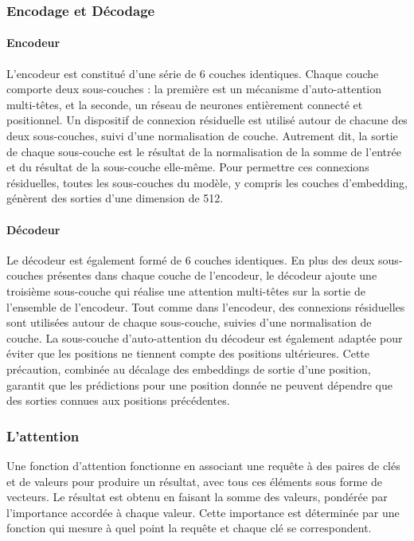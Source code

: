 \subsubsection{Encodage et Décodage}

\paragraph{Encodeur} \hspace{0pt}

L'encodeur est constitué d'une série de 6 couches identiques. Chaque couche comporte deux sous-couches : la première est un mécanisme d'auto-attention multi-têtes, et la seconde, un réseau de neurones entièrement connecté et positionnel. Un dispositif de connexion résiduelle est utilisé autour de chacune des deux sous-couches, suivi d'une normalisation de couche. Autrement dit, la sortie de chaque sous-couche est le résultat de la normalisation de la somme de l'entrée et du résultat de la sous-couche elle-même. Pour permettre ces connexions résiduelles, toutes les sous-couches du modèle, y compris les couches d'embedding, génèrent des sorties d'une dimension de 512.

\paragraph{Décodeur} \hspace{0pt}

Le décodeur est également formé de 6 couches identiques. En plus des deux sous-couches présentes dans chaque couche de l'encodeur, le décodeur ajoute une troisième sous-couche qui réalise une attention multi-têtes sur la sortie de l'ensemble de l'encodeur. Tout comme dans l'encodeur, des connexions résiduelles sont utilisées autour de chaque sous-couche, suivies d'une normalisation de couche. La sous-couche d'auto-attention du décodeur est également adaptée pour éviter que les positions ne tiennent compte des positions ultérieures. Cette précaution, combinée au décalage des embeddings de sortie d'une position, garantit que les prédictions pour une position donnée ne peuvent dépendre que des sorties connues aux positions précédentes.

\subsubsection{L'attention}
Une fonction d'attention fonctionne en associant une requête à des paires de clés et de valeurs pour produire un résultat, avec tous ces éléments sous forme de vecteurs. Le résultat est obtenu en faisant la somme des valeurs, pondérée par l'importance accordée à chaque valeur. Cette importance est déterminée par une fonction qui mesure à quel point la requête et chaque clé se correspondent.

